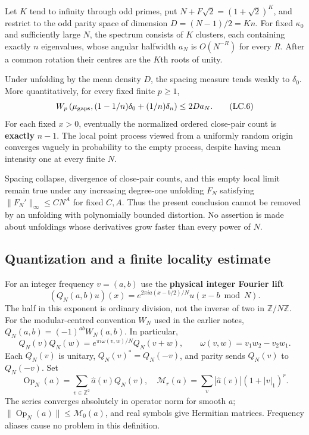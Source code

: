 \begin{theorem}\label{pass1:ch09_locality_fixed_strength-3} Let \(K\) tend to infinity through odd primes, put \(N+F\sqrt2=(1+\sqrt2)^K\), and restrict to the odd parity space of dimension \(D=(N-1)/2=Kn\). For fixed \({\kappa_0}\) and sufficiently large \(N\), the spectrum consists of \(K\) clusters, each containing exactly \(n\) eigenvalues, whose angular halfwidth \(a_N\) is \(O(N^{-R})\) for every \(R\). After a common rotation their centres are the \(K\)th roots of unity.
\end{theorem}

Under unfolding by the mean density \(D\), the spacing measure tends weakly to \(\delta_0\). More quantitatively, for every fixed finite \(p\geq1\), \[
 W_p\left(\mu_{\rm gaps},(1-1/n)\delta_0+(1/n)\delta_n\right)
       \leq2Da_N.                                           \tag{LC.6}
\] For each fixed \(x>0\), eventually the normalized ordered close-pair count is \textbf{exactly} \(n-1\). The local point process viewed from a uniformly random origin converges vaguely in probability to the empty process, despite having mean intensity one at every finite \(N\).

Spacing collapse, divergence of close-pair counts, and this empty local limit remain true under any increasing degree-one unfolding \(F_N\) satisfying \(\|F_N'\|_\infty\leq C N^A\) for fixed \(C,A\). Thus the present conclusion cannot be removed by an unfolding with polynomially bounded distortion. No assertion is made about unfoldings whose derivatives grow faster than every power of \(N\).

\subsection{Quantization and a finite locality estimate}\label{locality:quantization-and-a-finite-locality-estimate}

For an integer frequency \(v=(a,b)\) use the \textbf{physical integer Fourier lift} \[
 (Q_N(a,b)u)(x)=e^{2\pi ia(x-b/2)/N}u(x-b\bmod N).
\] The half in this exponent is ordinary division, not the inverse of two in \(\mathbb Z/N\mathbb Z\). For the modular-centred convention \(W_N\) used in the earlier notes, \(Q_N(a,b)=(-1)^{ab}W_N(a,b)\). In particular, \[
 Q_N(v)Q_N(w)=e^{\pi i\omega(v,w)/N}Q_N(v+w),\qquad
 \omega(v,w)=v_1w_2-v_2w_1.                                 \tag{LC.7}
\] Each \(Q_N(v)\) is unitary, \(Q_N(v)^*=Q_N(-v)\), and parity sends \(Q_N(v)\) to \(Q_N(-v)\). Set \[
 \operatorname{Op}_N(a)=\sum_{v\in\mathbb Z^2}\widehat a(v)Q_N(v),
 \quad \mathcal M_r(a)=\sum_v|\widehat a(v)|(1+|v|_1)^r.
\] The series converges absolutely in operator norm for smooth \(a\); \(\|\operatorname{Op}_N(a)\|\leq\mathcal M_0(a)\), and real symbols give Hermitian matrices. Frequency aliases cause no problem in this definition.

